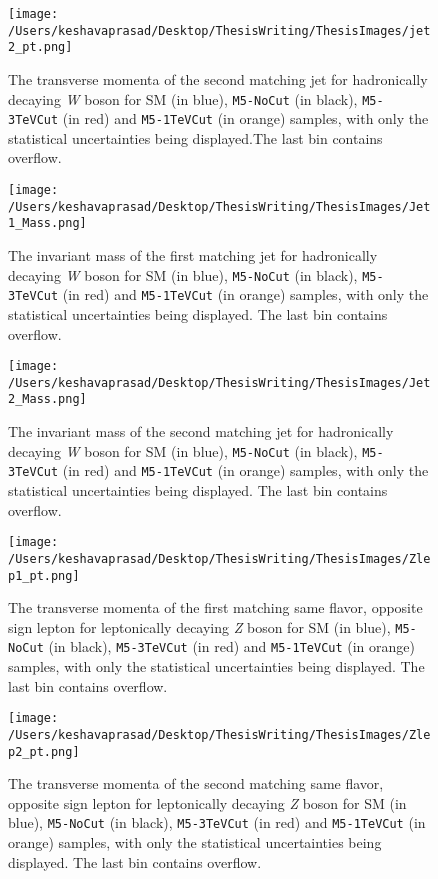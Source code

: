 \begin{figure}[!h]%
	\centering
	\texttt{[image: /Users/keshavaprasad/Desktop/ThesisWriting/ThesisImages/jet2\_pt.png]}
	\caption{The transverse momenta of the second matching jet for hadronically decaying \textit{W} boson for SM (in blue), \texttt{M5-NoCut} (in black), \texttt{M5-3TeVCut} (in red) and \texttt{M5-1TeVCut} (in orange) samples, with only the statistical uncertainties being displayed.The last bin contains overflow. }
	\label{Jet2-pt}
\end{figure}
\begin{figure}[!htb]%
	\centering
	\texttt{[image: /Users/keshavaprasad/Desktop/ThesisWriting/ThesisImages/Jet1\_Mass.png]}
	\caption{The invariant mass of the first matching jet for hadronically decaying \textit{W} boson for SM (in blue), \texttt{M5-NoCut} (in black), \texttt{M5-3TeVCut} (in red) and \texttt{M5-1TeVCut} (in orange) samples, with only the statistical uncertainties being displayed. The last bin contains overflow.}
	\label{Jet1-Mass}
\end{figure}

\begin{figure}[!h]%
	\centering
	\texttt{[image: /Users/keshavaprasad/Desktop/ThesisWriting/ThesisImages/Jet2\_Mass.png]}
	\caption{The invariant mass of the second matching jet for hadronically decaying \textit{W} boson for SM (in blue), \texttt{M5-NoCut} (in black), \texttt{M5-3TeVCut} (in red) and \texttt{M5-1TeVCut} (in orange) samples, with only the statistical uncertainties being displayed. The last bin contains overflow.}
	\label{Jet2_Mass}
\end{figure}


\begin{figure}[!htb]%
	\centering
	\texttt{[image: /Users/keshavaprasad/Desktop/ThesisWriting/ThesisImages/Zlep1\_pt.png]}
	\caption{The transverse momenta of the first matching same flavor, opposite sign lepton for leptonically decaying \textit{Z} boson for SM (in blue), \texttt{M5-NoCut} (in black), \texttt{M5-3TeVCut} (in red) and \texttt{M5-1TeVCut} (in orange) samples, with only the statistical uncertainties being displayed. The last bin contains overflow.}
	\label{Zlep1_pt}
\end{figure}

\begin{figure}[!h]%
	\centering
	\texttt{[image: /Users/keshavaprasad/Desktop/ThesisWriting/ThesisImages/Zlep2\_pt.png]}
	\caption{The transverse momenta of the second matching same flavor, opposite sign lepton for leptonically decaying \textit{Z} boson for SM (in blue), \texttt{M5-NoCut} (in black), \texttt{M5-3TeVCut} (in red) and \texttt{M5-1TeVCut} (in orange) samples, with only the statistical uncertainties being displayed. The last bin contains overflow.}
	\label{Zlep2-pt}
\end{figure}

